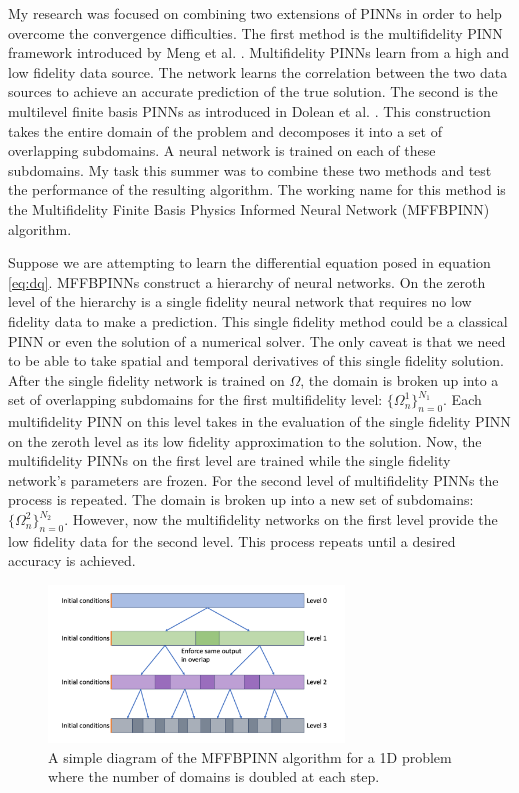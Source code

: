 \documentclass[12pt]{article}
\begin{document}
\par My research was focused on combining two extensions of PINNs in order to help overcome the convergence difficulties. The first method is the multifidelity PINN framework introduced by Meng et al. \cite{mfpinns}. Multifidelity PINNs learn from a high and low fidelity data source. The network learns the correlation between the two data sources to achieve an accurate prediction of the true solution. The second is the multilevel finite basis PINNs as introduced in Dolean et al. \cite{fbpinns}. This construction takes the entire domain of the problem and decomposes it into a set of overlapping subdomains. A neural network is trained on each of these subdomains. My task this summer was to combine these two methods and test the performance of the resulting algorithm. The working name for this method is the Multifidelity Finite Basis Physics Informed Neural Network (MFFBPINN) algorithm. 
\par Suppose we are attempting to learn the differential equation posed in equation \ref{eq:dq}. MFFBPINNs construct a hierarchy of neural networks. On the zeroth level of the hierarchy is a single fidelity neural network that requires no low fidelity data to make a prediction. This single fidelity method could be a classical PINN or even the solution of a numerical solver. The only caveat is that we need to be able to take spatial and temporal derivatives of this single fidelity solution. After the single fidelity network is trained on $\Omega$, the domain is broken up into a set of overlapping subdomains for the first multifidelity level: $\{\Omega^1_n\}_{n=0}^{N_1}$. Each multifidelity PINN on this level takes in the evaluation of the single fidelity PINN on the zeroth level as its low fidelity approximation to the solution. Now, the multifidelity PINNs on the first level are trained while the single fidelity network's parameters are frozen. For the second level of multifidelity PINNs the process is repeated. The domain is broken up into a new set of subdomains: $\{\Omega^2_n\}_{n=0}^{N_2}$. However, now the multifidelity networks on the first level provide the low fidelity data for the second level. This process repeats until a desired accuracy is achieved.

\begin{figure}[H]
\centering
\includegraphics[width=0.7\textwidth]{imgs/domain_decomp.png}
\caption{A simple diagram of the MFFBPINN algorithm for a 1D problem where the number of domains is doubled at each step.}
\label{fig:dd}
\end{figure}
\end{document}
